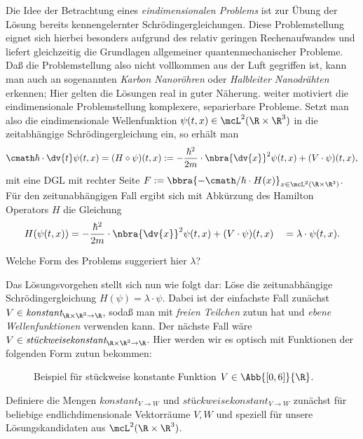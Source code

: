 \documentclass{subfiles}
\begin{document}

    Die Idee der Betrachtung eines \emph{eindimensionalen Problems} ist zur Übung der Lösung bereits kennengelernter Schrödingergleichungen. Diese Problemstellung eignet sich hierbei besonders aufgrund des relativ geringen Rechenaufwandes und liefert gleichzeitig die Grundlagen allgemeiner quantenmechanischer Probleme. Daß die Problemstellung also nicht vollkommen aus der Luft gegriffen ist, kann man auch an sogenannten \emph{Karbon Nanoröhren} oder \emph{Halbleiter Nanodrähten} erkennen; Hier gelten die Lösungen real in guter Näherung. weiter motiviert die eindimensionale Problemstellung komplexere, separierbare Probleme. Setzt man also die eindimensionale Wellenfunktion $\psi(t,x)\in\mcL^2(\R\times\R^3)$ in die zeitabhängige Schrödingergleichung ein, so erhält man
    \[\cmath\hbar\cdot \dv{t}\psi(t,x) = (H\circ\psi)(t,x) := -\frac{\hbar^2}{2m}\cdot\nbra{\dv{x}}^2\psi(t,x) + (V\cdot\psi)(t,x),\]
    mit eine DGL mit rechter Seite $F:=\bbra{-\cmath/\hbar\cdot H(x)}_{x\in\mcL^2(\R\times\R^3)}$. Für den zeitunabhängigen Fall ergibt sich mit Abkürzung des Hamilton Operators $H$ die Gleichung
    \[H(\psi(t,x)) = -\frac{\hbar^2}{2m}\cdot\nbra{\dv{x}}^2\psi(t,x) + (V\cdot\psi)(t,x) \quad = \lambda\cdot\psi(t,x).\]

    \begin{Aufgabe}
        \nr{} Welche Form des Problems suggeriert hier $\lambda$?  
    \end{Aufgabe}
    Das Lösungsvorgehen stellt sich nun wie folgt dar: Löse die zeitunabhängige Schrödingergleichung $H(\psi) = \lambda\cdot\psi$. Dabei ist der einfachste Fall zunächst $V\in\textit{konstant}_{\R\times\R^3\to\R}$, sodaß man mit \emph{freien Teilchen} zutun hat und \emph{ebene Wellenfunktionen} verwenden kann. Der nächste Fall wäre $V\in\textit{stückweisekonstant}_{\R\times\R^3\to\R}$. Hier werden wir es optisch mit Funktionen der folgenden Form zutun bekommen:
    \begin{figure}[H]
        \centering
        \caption{Beispiel für stückweise konstante Funktion $V\in\Abb{[0,6]}{\R}$.}
    \end{figure}
    \begin{Aufgabe}
        \nr{} Definiere die Mengen $\textit{konstant}_{V\to W}$ und $\textit{stückweisekonstant}_{V\to W}$ zunächst für beliebige endlichdimensionale Vektorräume $V,W$ und speziell für unsere Lösungskandidaten aus $\mcL^2(\R\times\R^3)$. 
    \end{Aufgabe}
\end{document}
